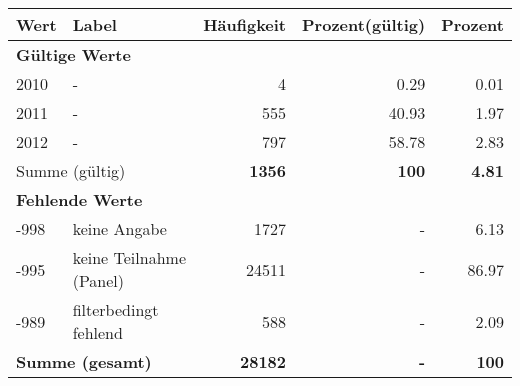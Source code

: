      \begin{longtable}{lXrrr}
     \toprule
     \textbf{Wert} & \textbf{Label} & \textbf{Häufigkeit} & \textbf{Prozent(gültig)} & \textbf{Prozent} \\
     \endhead
     \midrule
     \multicolumn{5}{l}{\textbf{Gültige Werte}}\\

     2010 &
     \multicolumn{1}{X}{ -  } &


       \num{4} &
       \num[round-mode=places,round-precision=2]{0.29} &
         \num[round-mode=places,round-precision=2]{0.01} \\

     2011 &
     \multicolumn{1}{X}{ -  } &


       \num{555} &
       \num[round-mode=places,round-precision=2]{40.93} &
         \num[round-mode=places,round-precision=2]{1.97} \\

     2012 &
     \multicolumn{1}{X}{ -  } &


       \num{797} &
       \num[round-mode=places,round-precision=2]{58.78} &
         \num[round-mode=places,round-precision=2]{2.83} \\
     \midrule
     \multicolumn{2}{l}{Summe (gültig)} &
       \textbf{\num{1356}} &
     \textbf{100} &
       \textbf{\num[round-mode=places,round-precision=2]{4.81}} \\
     \multicolumn{5}{l}{\textbf{Fehlende Werte}}\\
       -998 &
       keine Angabe &
         \num{1727} &
        - &
         \num[round-mode=places,round-precision=2]{6.13} \\
       -995 &
       keine Teilnahme (Panel) &
         \num{24511} &
        - &
         \num[round-mode=places,round-precision=2]{86.97} \\
       -989 &
       filterbedingt fehlend &
         \num{588} &
        - &
         \num[round-mode=places,round-precision=2]{2.09} \\
     \midrule
     \multicolumn{2}{l}{\textbf{Summe (gesamt)}} &
          \textbf{\num{28182}} &
        \textbf{-} &
        \textbf{100} \\
     \bottomrule
     \end{longtable}
     
